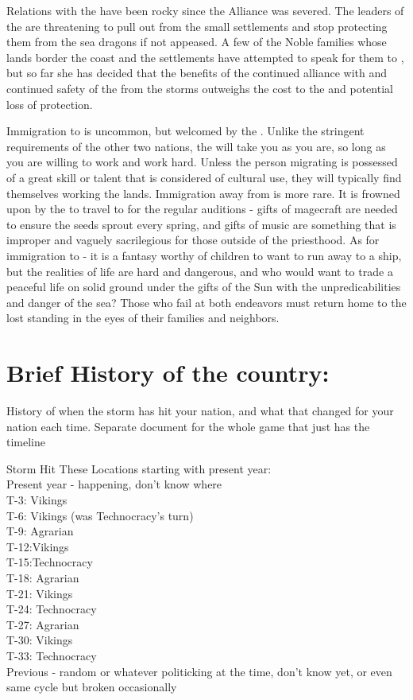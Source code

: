 \documentclass[blue]{GL2020}
\begin{document}
Relations with the \pVikings{} have been rocky since the Alliance was severed.  The leaders of the \pVikings{} are threatening to pull out from the small settlements and stop protecting them from the sea dragons if not appeased.  A few of the Noble families whose lands border the coast and the \pVikings{} settlements have attempted to speak for them to \cQueen{}, but so far she has decided that the benefits of the continued alliance with \pCreators{} and continued safety of the \pSunCh{} from the storms outweighs the cost to the \pVikings{} and potential loss of protection.

Immigration to \pSun{} is uncommon, but welcomed by the \pSunCh{}.  Unlike the stringent requirements of the other two nations, the \pSunCh{} will take you as you are, so long as you are willing to work and work hard.  Unless the person migrating is possessed of a great skill or talent that is considered of cultural use, they will typically find themselves working the lands.  Immigration away from \pSun{} is more rare.  It is frowned upon by the \pSunCh{} to travel to \pCreators{} for the regular auditions - gifts of magecraft are needed to ensure the seeds sprout every spring, and gifts of music are something that is improper and vaguely sacrilegious for those outside of the priesthood.  As for immigration to \pVikings{} - it is a fantasy worthy of children to want to run away to a \pVikings{} ship, but the realities of \pVikings{} life are hard and dangerous, and who would want to trade a peaceful life on solid ground under the gifts of the Sun with the unpredicabilities and danger of the sea?  Those who fail at both endeavors must return home to the lost standing in the eyes of their families and neighbors.

\section*{Brief History of the country:}

History of when the storm has hit your nation, and what that changed for your nation each time.
Separate document for the whole game that just has the timeline

Storm Hit These Locations starting with present year:\\
Present year - happening, don’t know where\\
T-3: Vikings\\
T-6: Vikings (was Technocracy’s turn)\\
T-9: Agrarian\\
T-12:Vikings\\
T-15:Technocracy\\
T-18: Agrarian\\
T-21: Vikings\\
T-24: Technocracy\\
T-27: Agrarian\\
T-30: Vikings\\
T-33: Technocracy\\
Previous - random or whatever politicking at the time, don’t know yet, or even same cycle but broken occasionally\\
\end{document}
